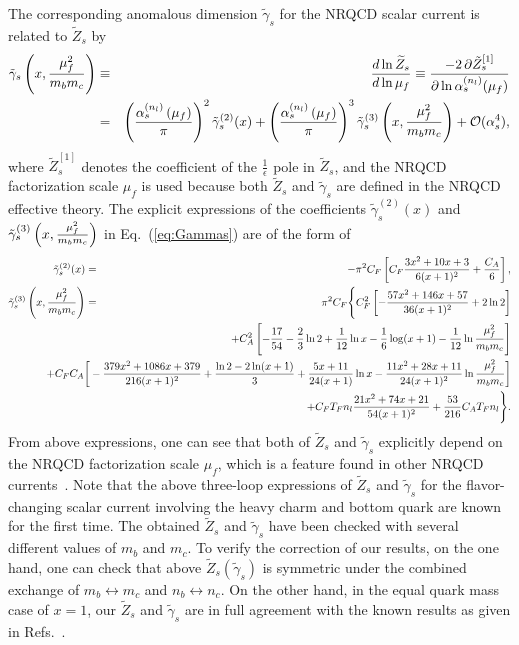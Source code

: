 \documentclass[onecolumn,preprintnumbers,aps,superscriptaddress,nofootinbib,prd,notitlepage]{revtex4-1}
\newcommand{\beq}{\begin{eqnarray}}
\newcommand{\eeq}{\end{eqnarray}}
\newcommand{\non}{\nonumber\\ }
\begin{document}
The corresponding anomalous dimension $\tilde{\gamma}_{s}$ for the NRQCD scalar current  is related to $\tilde{Z}_s$ by~\cite{Groote:1996xb,Kiselev:1998wb,Henn:2016tyf,Fael:2022miw,Grozin:2015kna,Ozcelik:2021zqt}
\beq
\tilde{\gamma}_s\left(x, {\mu^2_f\over m_b m_c } \right) &\equiv & {d \ln \widetilde{Z}_s \over d \ln \mu_f }  \equiv \frac{-2\, \partial{\tilde{Z}_s^{[1]}}}{\partial\ln\alpha_s^{(n_l)}(\mu_f)} \non
&=& \left(\frac{\alpha_s^{(n_l)} 	\left(\mu_f\right)}{\pi}\right)^2 \tilde{\gamma}_s^{(2)}(x ) +\left(\frac{\alpha_s^{\left(n_l\right)	}
\left(\mu_f\right)}{\pi}\right)^3 \tilde{\gamma}_s^{(3)}\left(x, {\mu^2_f\over m_b m_c }\right)+\mathcal{O}(\alpha^4_s), \label{eq:Gammas}
\eeq
where $\tilde{Z}_{s}^{[1]}$ denotes the coefficient of the $\frac{1}{\epsilon}$ pole in $\tilde{Z}_s$, and the  NRQCD factorization scale $\mu_f$ is used because both  $\tilde{Z}_{s}$ and  $\tilde{\gamma}_{s}$ are defined
in the NRQCD effective theory. The explicit expressions of the coefficients $\tilde{\gamma}_s^{(2)}(x )$ and $\tilde{\gamma}_s^{(3)}\left(x, {\mu^2_f\over m_b m_c }\right)$ in Eq.~(\ref{eq:Gammas}) are of the form of
\beq
\tilde{\gamma}_s^{(2)}(x )&=& -\pi^2C_F\left[  C_F \frac{3 x^2+10	x+3}{6(x+1)^2} +\frac{C_A}{6} \right], \label{eq:Gammas2} \\
\tilde{\gamma}_s^{(3)}\left(x, {\mu^2_f\over m_b m_c }\right)&=&  \pi^2C_F\Bigg\{  C_F^2 \left[-\frac{57 x^2+146 x+57}{36 (x+1)^2}+2 \ln 2 \right] \non
&&\hspace{-2cm}+ C_A^2 \left[-\frac{17}{54}-\frac{2 }{3}\ln 2+\frac{1}{12}\ln x-\frac{1}{6} \log (x+1)-\frac{1}{12} \ln \frac{\mu_f^2}{m_b m_c}\right] \non
&&\hspace{-2cm}+ C_F C_A \bigg[-\frac{379 x^2+1086 x+379}{216 (x+1)^2}+\frac{\ln 2 -2\ln(x+1)}{3} +\frac{5 x+11 }{24 (x+1)}\ln x-\frac{11 x^2+28 x+11}{24 (x+1)^2}\ln\frac{\mu_f^2}{m_b m_c}\bigg] \non
&&\hspace{-2cm}+ C_F T_F n_l \frac{21 x^2+74 x+21}{54 (x+1)^2}+\frac{53}{216} C_A T_F n_l \Bigg\}. \label{eq:Gammas3}
\eeq
From above expressions, one can see that both of $\tilde{Z}_{s}$ and  $\tilde{\gamma}_{s}$ explicitly depend on the NRQCD factorization scale $\mu_f$, which is a feature found in other NRQCD currents~\cite{Marquard:2014pea,Egner:2022jot,Feng:2022vvk,Feng:2022ruy,Sang:2022tnh}.
Note that the above three-loop expressions of $\widetilde{Z}_{s}$ and $\tilde{\gamma}_{s}$ for  the flavor-changing scalar current involving the heavy charm and bottom quark are known for the first time.
The obtained $\widetilde{Z}_{s}$ and $\tilde{\gamma}_{s}$ have been checked with several different values of $m_b$ and $m_c$.
To verify the correction of our results, on the one hand, one can check that  above $\widetilde{Z}_s\left(\tilde{\gamma}_{s}\right)$  is  symmetric under the combined exchange of $m_b\leftrightarrow m_c$ and
$n_b\leftrightarrow n_c$.  On the other hand, in the equal quark mass case of $x=1$, our $\widetilde{Z}_s$ and $\tilde{\gamma}_{s}$ are in full agreement with the known results
as given in Refs.~\cite{Kniehl:2006qw,Piclum:2007an,Egner:2022jot}.
\end{document}

